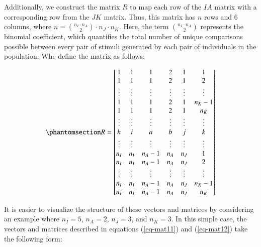 \documentclass[
  authoryear,
  review,
  1p]{elsarticle}
\begin{document}
Additionally, we construct the matrix \(R\) to map each row of the
\(IA\) matrix with a corresponding row from the \(JK\) matrix. Thus,
this matrix has \(n\) rows and \(6\) columns, where
\(n = {n_{I} \cdot n_{A} \choose 2} \cdot n_{J} \cdot n_{K}\). Here, the
term \({n_{I} \cdot n_{A} \choose 2}\) represents the binomial
coefficient, which quantifies the total number of unique comparisons
possible between every pair of stimuli generated by each pair of
individuals in the population. Whe define the matrix as follows:

\begin{equation}\phantomsection\label{eq-mat12}{
R = \begin{bmatrix}
1 & 1 & 1 & 2 & 1 & 1 \\
1 & 1 & 1 & 2 & 1 & 2 \\
\vdots & \vdots & \vdots & \vdots & \vdots & \vdots\\
1 & 1 & 1 & 2 & 1 & n_{K}-1 \\
1 & 1 & 1 & 2 & 1 & n_{K} \\
\vdots & \vdots & \vdots & \vdots & \vdots & \vdots\\
h & i & a & b & j & k \\
\vdots & \vdots & \vdots & \vdots & \vdots & \vdots\\
n_{I} & n_{I} & n_{A}-1 & n_{A} & n_{J} & 1 \\
n_{I} & n_{I} & n_{A}-1 & n_{A} & n_{J} & 2 \\
\vdots & \vdots & \vdots & \vdots & \vdots & \vdots\\
n_{I} & n_{I} & n_{A}-1 & n_{A} & n_{J} & n_{K}-1 \\
n_{I} & n_{I} & n_{A}-1 & n_{A} & n_{J} & n_{K} \\
\end{bmatrix}
}\end{equation}

It is easier to visualize the structure of these vectors and matrices by
considering an example where \(n_{I} = 5\), \(n_{A} = 2\),
\(n_{J} = 3\), and \(n_{K} = 3\). In this simple case, the vectors and
matrices described in equations (\ref{eq-mat11}) and (\ref{eq-mat12})
take the following form:
\end{document}
